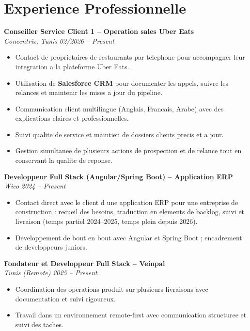 \documentclass[10pt,a4paper]{article}
\begin{document}
\section*{Experience Professionnelle}
{\small

\textbf{Conseiller Service Client 1 -- Operation sales Uber Eats}\\[1pt]
\textit{Concentrix, Tunis} \hfill \textit{02/2026 -- Present}
\begin{itemize}
  \item Contact de proprietaires de restaurants par telephone pour accompagner leur integration a la plateforme Uber Eats.
  \item Utilisation de \textbf{Salesforce CRM} pour documenter les appels, suivre les relances et maintenir les mises a jour du pipeline.
  \item Communication client multilingue (Anglais, Francais, Arabe) avec des explications claires et professionnelles.
  \item Suivi qualite de service et maintien de dossiers clients precis et a jour.
  \item Gestion simultanee de plusieurs actions de prospection et de relance tout en conservant la qualite de reponse.
\end{itemize}

\vspace{3pt}
\textbf{Developpeur Full Stack (Angular/Spring Boot) -- Application ERP}\\[1pt]
\textit{Wico} \hfill \textit{2024 -- Present}
\begin{itemize}
  \item Contact direct avec le client d une application ERP pour une entreprise de construction : recueil des besoins, traduction en elements de backlog, suivi et livraison (temps partiel 2024--2025, temps plein depuis 2026).
  \item Developpement de bout en bout avec Angular et Spring Boot ; encadrement de developpeurs juniors.
\end{itemize}

\vspace{3pt}
\textbf{Fondateur et Developpeur Full Stack -- Veinpal}\\[1pt]
\textit{Tunis (Remote)} \hfill \textit{2025 -- Present}
\begin{itemize}
  \item Coordination des operations produit sur plusieurs livraisons avec documentation et suivi rigoureux.
  \item Travail dans un environnement remote-first avec communication structuree et suivi des taches.
\end{itemize}

}
\end{document}
